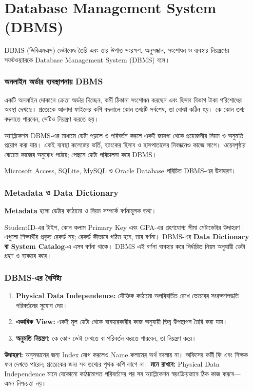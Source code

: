 \section{Database Management System (DBMS)}

\begin{definitionbox}{DBMS (ডিবিএমএস)}
ডেটাবেজ তৈরি এবং তার উপাত্ত সংরক্ষণ, অনুসন্ধান, সংশোধন ও ব্যবহার নিয়ন্ত্রণের সফটওয়্যারকে Database Management System (DBMS) বলে।
\end{definitionbox}

\subsubsection{অনলাইন অর্ডার ব্যবস্থাপনায় DBMS}
একটি অনলাইন দোকানে ক্রেতা অর্ডার দিচ্ছেন, কর্মী ঠিকানা সংশোধন করছেন এবং হিসাব বিভাগ টাকা পরিশোধের অবস্থা দেখছে। প্রত্যেকে আলাদা ফাইলের কপি বদলালে কোন তথ্যটি সর্বশেষ, তা বোঝা কঠিন হয়। কে কোন তথ্য বদলাতে পারবেন, সেটিও নিয়ন্ত্রণ করতে হয়।

অ্যাপ্লিকেশন DBMS-এর মাধ্যমে ডেটা পড়লে ও পরিবর্তন করলে একই জায়গা থেকে প্রয়োজনীয় নিয়ম ও অনুমতি প্রয়োগ করা যায়। একই ব্যবস্থা কলেজের ভর্তি, ব্যাংকের হিসাব ও হাসপাতালের নিবন্ধনেও কাজে লাগে। ওয়েবপৃষ্ঠার বোতাম কাজের অনুরোধ পাঠায়; পেছনে ডেটা পরিচালনা করে DBMS।

Microsoft Access, SQLite, MySQL ও Oracle Database পরিচিত DBMS-এর উদাহরণ। 



\subsubsection{Metadata ও Data Dictionary}
\begin{definitionbox}{}
\textbf{Metadata} হলো ডেটার কাঠামো ও নিয়ম সম্পর্কে বর্ণনামূলক তথ্য।
\end{definitionbox}
StudentID-এর টাইপ, কোন কলাম Primary Key এবং GPA-এর গ্রহণযোগ্য সীমা মেটাডেটার উদাহরণ। এগুলো শিক্ষার্থীর প্রকৃত রেকর্ড নয়; রেকর্ড কীভাবে গঠিত হবে, তার বর্ণনা। DBMS-এর \textbf{Data Dictionary বা System Catalog}-এ এসব বর্ণনা থাকে। DBMS এই বর্ণনা ব্যবহার করে নির্ধারিত নিয়ম অনুযায়ী ডেটা গ্রহণ ও ব্যবহার করে।

\subsubsection{DBMS-এর বৈশিষ্ট্য}
\begin{enumerate}
\item \textbf{Physical Data Independence:} যৌক্তিক কাঠামো অপরিবর্তিত রেখে ভেতরের সংরক্ষণপদ্ধতি পরিবর্তনের সুযোগ দেয়।
\item \textbf{একাধিক View:} একই মূল ডেটা থেকে ব্যবহারকারীর কাজ অনুযায়ী ভিন্ন উপস্থাপন তৈরি করা যায়।
\item \textbf{অনুমতি নিয়ন্ত্রণ:} কে কোন ডেটা দেখতে বা পরিবর্তন করতে পারবেন, তা নিয়ন্ত্রণ করে।
\end{enumerate}
\textbf{উদাহরণ:} অনুসন্ধানের জন্য Index যোগ করলেও Name কলামের অর্থ বদলায় না। অফিসের কর্মী ফি এবং শিক্ষক ফল দেখতে পারেন; প্রত্যেকের জন্য সব তথ্যের পৃথক কপি লাগে না।
\textbf{মনে রাখবে:} Physical Data Independence মানে যেকোনো কাঠামোগত পরিবর্তনের পর সব অ্যাপ্লিকেশন স্বয়ংক্রিয়ভাবে ঠিক কাজ করবে—এমন নিশ্চয়তা নয়।

